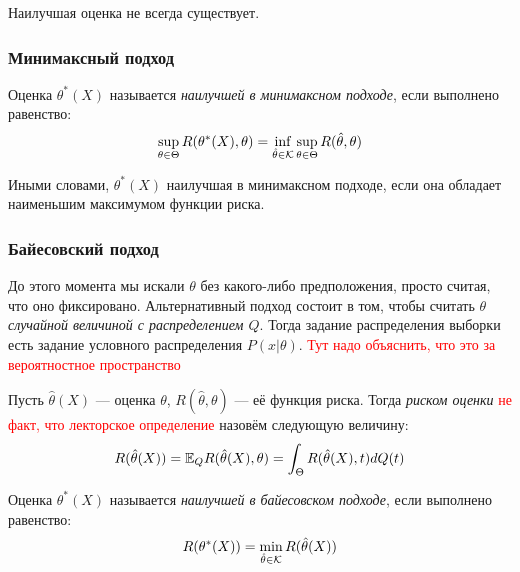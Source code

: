 \begin{note}
	Наилучшая оценка не всегда существует.
\end{note}

\subsubsection{Минимаксный подход}

\begin{definition}
	Оценка $\theta^*(X)$ называется \textit{наилучшей в минимаксном подходе}, если выполнено равенство:
	\[
		\sup_{\theta \in \Theta} R(\theta^*(X), \theta) = \inf_{\hat{\theta} \in \mathcal{K}} \sup_{\theta \in \Theta} R(\hat{\theta}, \theta)
	\]
\end{definition}

\begin{note}
	Иными словами, $\theta^*(X)$ наилучшая в минимаксном подходе, если она обладает наименьшим максимумом функции риска.
\end{note}

\subsubsection{Байесовский подход}

\begin{note}
	До этого момента мы искали $\theta$ без какого-либо предположения, просто считая, что оно фиксировано. Альтернативный подход состоит в том, чтобы считать $\theta$ \textit{случайной величиной с распределением $Q$}. Тогда задание распределения выборки есть задание условного распределения $P(x|\theta)$. \textcolor{red}{Тут надо объяснить, что это за вероятностное пространство}
\end{note}

\begin{definition}
	Пусть $\hat{\theta}(X)$ --- оценка $\theta$, $R(\hat{\theta}, \theta)$ --- её функция риска. Тогда \textit{риском оценки} \textcolor{red}{не факт, что лекторское определение} назовём следующую величину:
	\[
		R(\hat{\theta}(X)) = \mathbb{E}_Q R(\hat{\theta}(X), \theta) = \int_\Theta R(\hat{\theta}(X), t) dQ(t)
	\]
\end{definition}

\begin{definition}
	Оценка $\theta^*(X)$ называется \textit{наилучшей в байесовском подходе}, если выполнено равенство:
	\[
		R(\theta^*(X)) = \min_{\hat{\theta} \in \mathcal{K}} R(\hat{\theta}(X))
	\]
\end{definition}

